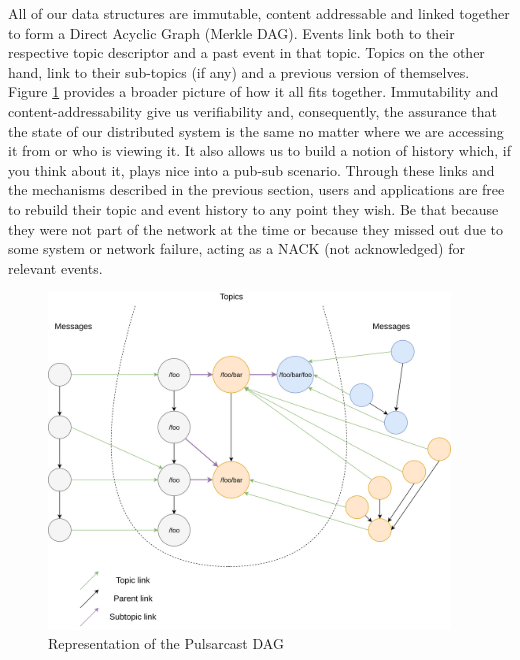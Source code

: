 All of our data structures are immutable, content addressable and linked
together to form a Direct Acyclic Graph (Merkle DAG). Events link both to their
respective topic descriptor and a past event in that topic. Topics on the other
hand, link to their sub-topics (if any) and a previous version of themselves.
Figure \ref{fig:pulsarcast-dag} provides a broader picture of how it all fits
together. Immutability and content-addressability give us verifiability and,
consequently, the assurance that the state of our distributed system is the
same no matter where we are accessing it from or who is viewing it. It also
allows us to build a notion of history which, if you think about it, plays nice
into a pub-sub scenario. Through these links and the mechanisms described in
the previous section, users and applications are free to rebuild their topic
and event history to any point they wish. Be that because they were not part of
the network at the time or because they missed out due to some system or
network failure, acting as a NACK (not acknowledged) for relevant events.

\begin{figure}[hb!]
  \centering
  \includegraphics[width=0.95\textwidth]{img/pulsarcast-dag.png}
  \caption{Representation of the Pulsarcast DAG}
  \label{fig:pulsarcast-dag}
\end{figure}


